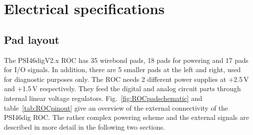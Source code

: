 \chapter{Electrical specifications}
\section{Pad layout}

The PSI46digV2.x ROC has 35 wirebond pads, 18 pads for powering and 17 pads for I/O signals. In addition, there are 5 smaller pads at the left and right, used for diagnostic purposes only. The ROC needs 2 different power supplies at +2.5\,V and +1.5\,V respectively. They feed the digital and analog circuit parts through internal linear voltage regulators. Fig.~\ref{fig:ROCpadschematic} and table~\ref{tab:ROCpinout} give an overview of the external connectivity of the PSI46dig ROC. The rather complex powering scheme and the external signals are described in more detail in the following two sections.\\  



